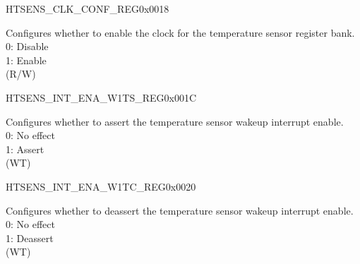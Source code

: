 \begin{register}{H}{TSENS\_CLK\_CONF\_REG}{0x0018}\label{regdesc:TSENSCLKCONFREG}
%
%
\regnewline%
\begin{regdesc}\begin{reglist}
\label{fielddesc:TSENSCLKEN}\item [TSENS\_CLK\_EN] Configures whether to enable the clock for the temperature sensor register bank.\\
0: Disable\\
1: Enable\\
(R/W)
\end{reglist}\end{regdesc}
\end{register}


\begin{register}{H}{TSENS\_INT\_ENA\_W1TS\_REG}{0x001C}\label{regdesc:TSENSINTENAW1TSREG}
%
%
\regnewline%
\begin{regdesc}\begin{reglist}
\label{fielddesc:TSENSCOCPUTSENSWAKEINTENAW1TS}\item [TSENS\_COCPU\_TSENS\_WAKE\_INT\_ENA\_W1TS] Configures whether to assert the temperature sensor wakeup interrupt enable.\\
0: No effect\\
1: Assert\\
(WT)
\end{reglist}\end{regdesc}
\end{register}


\begin{register}{H}{TSENS\_INT\_ENA\_W1TC\_REG}{0x0020}\label{regdesc:TSENSINTENAW1TCREG}
%
%
\regnewline%
\begin{regdesc}\begin{reglist}
\label{fielddesc:TSENSCOCPUTSENSWAKEINTENAW1TC}\item [TSENS\_COCPU\_TSENS\_WAKE\_INT\_ENA\_W1TC] Configures whether to deassert the temperature sensor wakeup interrupt enable.\\
0: No effect\\
1: Deassert\\
(WT)
\end{reglist}\end{regdesc}
\end{register}


